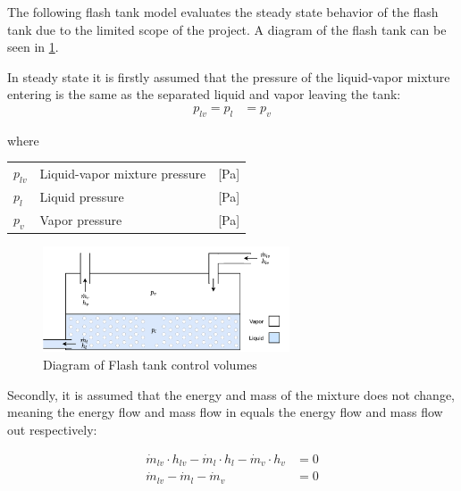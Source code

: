 The following flash tank model evaluates the steady state behavior of the flash tank due to the limited scope of the project. A diagram of the flash tank can be seen in \cref{fig:flash_tank_CV}.

In steady state it is firstly assumed that the pressure of the liquid-vapor mixture entering is the same as the separated liquid and vapor leaving the tank:
\begin{align}
	p_{lv} 	= p_{l}					&  = p_{v}
	\label{eq:Flash_tank_pressure}
\end{align}

where
\smallskip
\begin{center}
	\begin{tabular}{l p{8cm} l}
		$p_{lv}$				&  Liquid-vapor mixture pressure		& [\si{Pa}]\\
		$p_{l}$					&  Liquid pressure 						& [\si{Pa}] \\
		$p_{v}$					&  Vapor pressure						& [\si{Pa}]\\
	\end{tabular}
\end{center}

\begin{figure}[h!]
	\centering
	\includegraphics[width=0.65\textwidth]{Graphics/Flash_tank.pdf}
	\caption{Diagram of Flash tank control volumes}
	\label{fig:flash_tank_CV}
\end{figure}

Secondly, it is assumed that the energy and mass of the mixture does not change, meaning the energy flow and mass flow in equals the energy flow and mass flow out respectively:

\begin{align}
	\dot{m}_{lv} \cdot  h_{lv}  - \dot{m}_{l} \cdot  h_{l} - \dot{m}_{v} \cdot  h_{v} & = 0 \label{eq:Flash_tank_energyflow} \\
	\dot{m}_{lv} - \dot{m}_{l} - \dot{m}_{v} & = 0  \label{eq:Flash_tank_massflow}
\end{align}

